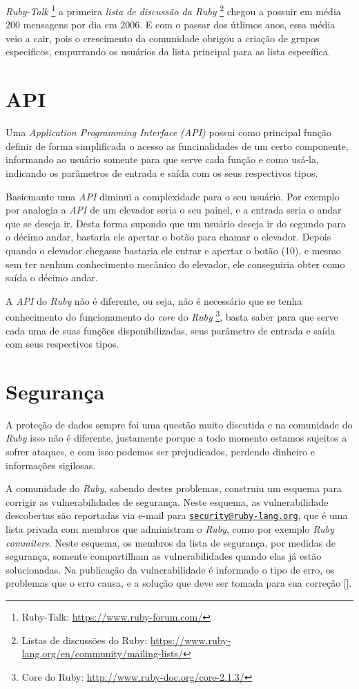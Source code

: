 \emph{Ruby-Talk} \footnote{Ruby-Talk: \url{https://www.ruby-forum.com/}} a primeira \emph{lista de
discussão da Ruby} \footnote{Listas de discussões do Ruby:
\url{https://www.ruby-lang.org/en/community/mailing-lists/}} chegou a possuir em média 200 mensagens por dia
em 2006. E com o passar dos útlimos anos, essa média veio a cair, pois o crescimento da comunidade
obrigou a criação de grupos especificos, empurrando os usuários da lista principal para as lista específica.


\section{API}
\label{section:API_ruby}

Uma \emph{Application Programming Interface (API)} possui como principal função definir de forma simplificada
o acesso as funcinalidades de um certo componente, informando ao usuário somente para que serve cada função
e como usá-la, indicando os parâmetros de entrada e saída com os seus respectivos tipos.

Basicmante uma \emph{API} diminui a complexidade para o seu usuário. Por exemplo por analogia a \emph{API}
de um elevador seria o seu painel, e a entrada seria o andar que se deseja ir. Desta forma supondo que
um usuário deseja ir do segundo para o décimo andar, bastaria ele apertar o botão para chamar o
elevador. Depois quando o elevador chegasse bastaria ele entrar e apertar o botão (10), e mesmo sem ter
nenhum conhecimento mecânico do elevador, ele conseguiria obter como saída o décimo andar.

A \emph{API} do \emph{Ruby} não é diferente, ou seja, não é necessário que se tenha
conhecimento do funcionamento do \emph{core} do \emph{Ruby}
\footnote{ Core do Ruby: \url{http://www.ruby-doc.org/core-2.1.3/}}, basta saber para que
serve cada uma de suas funções disponibilizadas, seus parâmetro de entrada e saída com seus respectivos tipos.

\section{Segurança}
\label{section:segurança_ruby}

A proteção de dados sempre foi uma questão muito discutida e na comunidade do \emph{Ruby} isso não é
diferente, justamente porque a todo momento estamos sujeitos a sofrer ataques, e com isso podemos ser
prejudicados, perdendo dinheiro e informações sigilosas.

A comunidade do \emph{Ruby}, sabendo destes problemas, construiu um esquema para corrigir as
vulnerabilidades de segurança. Neste esquema, as vulnerabilidade descobertas são reportadas via e-mail para
\href{mailto:security@ruby-lang.org}{\nolinkurl{security@ruby-lang.org}}, que é uma lista privada com
membros que administram o \emph{Ruby}, como por exemplo \emph{Ruby commiters}. Neste esquema, os membros da
lista de segurança, por medidas de segurança, somente compartilham as vulnerabilidades quando elas já estão
solucionadas. Na publicação da vulnerabilidade é informado o tipo de erro, os problemas que o erro causa,
e a solução que deve ser tomada para sua correção [].

